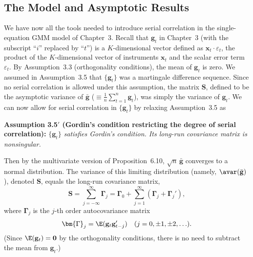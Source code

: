 
\subsection*{The Model and Asymptotic Results}

We have now all the tools needed to introduce serial correlation in the single-equation
GMM model of Chapter~3. Recall that $\mathbf{g}_t$ in Chapter~3 (with the subscript
``$i$'' replaced by ``$t$'') is a $K$-dimensional vector defined as $\mathbf{x}_t \cdot \varepsilon_t$, the product
of the $K$-dimensional vector of instruments $\mathbf{x}_t$ and the scalar error term $\varepsilon_t$. By
Assumption~3.3 (orthogonality conditions), the mean of $\mathbf{g}_t$ is zero. We assumed
in Assumption~3.5 that $\{\mathbf{g}_t\}$ was a martingale difference sequence. Since no serial
correlation is allowed under this assumption, the matrix $\mathbf{S}$, defined to be the asymptotic
variance of $\bar{\mathbf{g}}$ ($\equiv \frac{1}{n} \sum_{t=1}^{n} \mathbf{g}_t$), was simply the variance of $\mathbf{g}_t$. We can now allow
for serial correlation in $\{\mathbf{g}_t\}$ by relaxing Assumption~3.5 as

\medskip
\noindent\textbf{Assumption 3.5$'$ (Gordin's condition restricting the degree of serial correlation):}
\emph{$\{\mathbf{g}_t\}$ satisfies Gordin's condition. Its long-run covariance matrix is nonsingular.}

\medskip
Then by the multivariate version of Proposition~6.10, $\sqrt{n}\,\bar{\mathbf{g}}$ converges to a normal
distribution. The variance of this limiting distribution (namely, $\avar(\bar{\mathbf{g}})$), denoted
$\mathbf{S}$, equals the long-run covariance matrix,
\begin{equation}
  \mathbf{S} = \sum_{j=-\infty}^{\infty} \bm{\Gamma}_j
  = \bm{\Gamma}_0 + \sum_{j=1}^{\infty} (\bm{\Gamma}_j + \bm{\Gamma}_j'),
  \label{eq:6.6.1}
\end{equation}
where $\bm{\Gamma}_j$ is the $j$-th order autocovariance matrix
\begin{equation}
  \bm{\Gamma}_j = \E(\mathbf{g}_t \mathbf{g}_{t-j}')
  \quad (j = 0, \pm 1, \pm 2, \ldots).
  \label{eq:6.6.2}
\end{equation}
(Since $\E(\mathbf{g}_t) = \mathbf{0}$ by the orthogonality conditions, there is no need to subtract the
mean from $\mathbf{g}_t$.)

